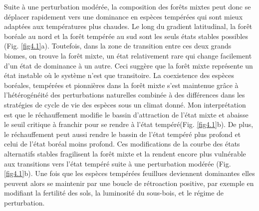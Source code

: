 Suite à une perturbation modérée, la composition des forêts mixtes peut
donc se déplacer rapidement vers une dominance en espèces tempérées qui
sont mieux adaptées aux températures plus chaudes. Le long du gradient
latitudinal, la forêt boréale au nord et la forêt tempérée au sud sont
les seuls états stables possibles (Fig. \ref{fig4.1}a). Toutefois, dans
la zone de transition entre ces deux grands biomes, on trouve la forêt
mixte, un état relativement rare qui change facilement d'un état de
dominance à un autre. Ceci suggère que la forêt mixte représente un état
instable où le système n'est que transitoire. La coexistence des espèces
boréales, tempérées et pionnières dans la forêt mixte s'est maintenue
grâce à l'hétérogénéité des perturbations naturelles combinée à des
différences dans les stratégies de cycle de vie des espèces
\citep{kneeshaw_natural_2007, bouchard_tree_2006} sous un climat donné.
Mon interprétation est que le réchauffement modifie le bassin
d'attraction de l'état mixte et abaisse le seuil critique à franchir
pour se rendre à l'état tempéré(Fig. \ref{fig4.1}b). De plus, le
réchauffement peut aussi rendre le bassin de l'état tempéré plus profond
et celui de l'état boréal moins profond. Ces modifications de la courbe
des états alternatifs stables fragilisent la forêt mixte et la rendent
encore plus vulnérable aux transitions vers l'état tempéré suite à une
perturbation modérée (Fig. \ref{fig4.1}b). Une fois que les espèces
tempérées feuillues deviennent dominantes elles peuvent alors se
maintenir par une boucle de rétroaction positive, par exemple en
modifiant la fertilité des sols, la luminosité du sous-bois, et le
régime de perturbation.

